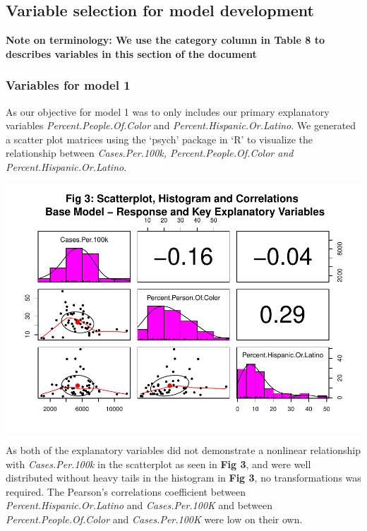 \documentclass[
]{article}
\begin{document}
\hypertarget{variable-selection-for-model-development}{%
\subsection{Variable selection for model
development}\label{variable-selection-for-model-development}}

\textbf{Note on terminology: We use the category column in Table 8 to
describes variables in this section of the document}

\hypertarget{variables-for-model-1}{%
\subsubsection{Variables for model 1}\label{variables-for-model-1}}

As our objective for model 1 was to only includes our primary
explanatory variables \emph{Percent.People.Of.Color} and
\emph{Percent.Hispanic.Or.Latino}. We generated a scatter plot matrices
using the `psych' package in `R' to visualize the relationship between
\emph{Cases.Per.100k, Percent.People.Of.Color and
Percent.Hispanic.Or.Latino}.

\includegraphics{Final_Report_files/figure-latex/unnamed-chunk-3-1.pdf}

As both of the explanatory variables did not demonstrate a nonlinear
relationship with \emph{Cases.Per.100k} in the scatterplot as seen in
\textbf{Fig 3}, and were well distributed without heavy tails in the
histogram in \textbf{Fig 3}, no transformations was required. The
Pearson's correlations coefficient between
\emph{Percent.Hispanic.Or.Latino} and \emph{Cases.Per.100K} and between
\emph{Percent.People.Of.Color} and \emph{Cases.Per.100K} were low on
their own.
\end{document}
